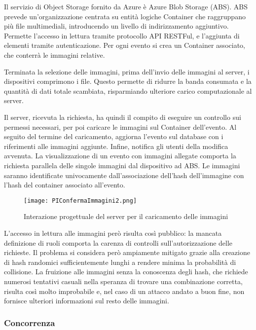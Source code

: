 Il servizio di Object Storage fornito da Azure è Azure Blob Storage (ABS). ABS prevede un'organizzazione centrata su entità logiche Container che raggruppano più file multimediali, introducendo un livello di indirizzamento aggiuntivo. Permette l’accesso in lettura tramite protocollo API RESTFul, e l’aggiunta di elementi tramite autenticazione. Per ogni evento si crea un Container associato, che conterrà le immagini relative.

Terminata la selezione delle immagini, prima dell’invio delle immagini al server, i dispositivi comprimono i file. Questo permette di ridurre la banda consumata e la quantità di dati totale scambiata, risparmiando ulteriore carico computazionale al server.


Il server, ricevuta la richiesta, ha quindi il compito di eseguire un controllo sui permessi necessari, per poi caricare le immagini sul Container dell’evento. Al seguito del termine del caricamento, aggiorna l’evento sul database con i riferimenti alle immagini aggiunte. Infine, notifica gli utenti della modifica avvenuta.
La visualizzazione di un evento con immagini allegate comporta la richiesta parallela delle singole immagini dal dispositivo ad ABS. Le immagini saranno identificate univocamente dall'associazione dell’hash dell’immagine con l’hash del container associato all’evento.


\begin{figure}[h!]
    \centering
    \texttt{[image: PIConfermaImmagini2.png]}
    \caption{Interazione progettuale del server per il caricamento delle immagini }
\end{figure}	

L’accesso in lettura alle immagini però risulta così pubblico: la mancata definizione di ruoli comporta la carenza di controlli sull’autorizzazione delle richieste. Il problema si considera però ampiamente mitigato grazie alla creazione di hash randomici sufficientemente lunghi a rendere minima la probabilità di collisione.  La fruizione alle immagini senza la conoscenza degli hash, che richiede numerosi tentativi casuali nella speranza di trovare una combinazione corretta, risulta così molto improbabile e, nel caso di un attacco andato a buon fine, non fornisce ulteriori informazioni sul resto delle immagini.



\clearpage

\subsubsection{ Concorrenza }


